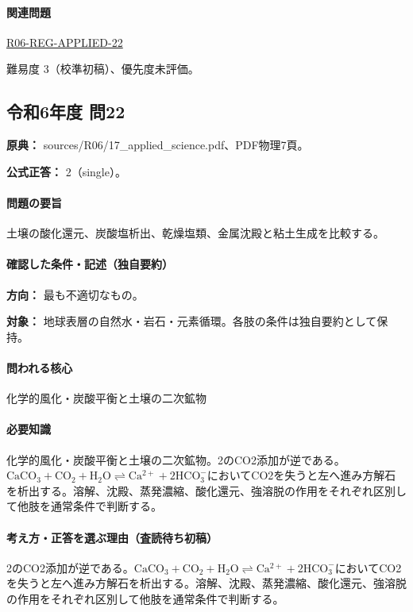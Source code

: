 \paragraph{関連問題} \hyperref[q:r06-reg-applied-22]{R06-REG-APPLIED-22}

\par 難易度 3（校準初稿）、優先度未評価。

\subsection{令和6年度 問22}
\label{q:r06-reg-applied-22}

\noindent\textbf{原典：} sources/R06/17\_applied\_science.pdf、PDF物理7頁。

\textbf{公式正答：} 2（single）。

\paragraph{問題の要旨} 土壌の酸化還元、炭酸塩析出、乾燥塩類、金属沈殿と粘土生成を比較する。

\paragraph{確認した条件・記述（独自要約）}\mbox{}\par

\noindent\textbf{方向：} 最も不適切なもの。\par

\noindent\textbf{対象：} 地球表層の自然水・岩石・元素循環。各肢の条件は独自要約として保持。\par

\paragraph{問われる核心} 化学的風化・炭酸平衡と土壌の二次鉱物

\paragraph{必要知識} 化学的風化・炭酸平衡と土壌の二次鉱物。2のCO2添加が逆である。\(\mathrm{CaCO_3+CO_2+H_2O\rightleftharpoons Ca^{2+}+2HCO_3^-}\)においてCO2を失うと左へ進み方解石を析出する。溶解、沈殿、蒸発濃縮、酸化還元、強溶脱の作用をそれぞれ区別して他肢を通常条件で判断する。

\paragraph{考え方・正答を選ぶ理由（査読待ち初稿）} 2のCO2添加が逆である。\(\mathrm{CaCO_3+CO_2+H_2O\rightleftharpoons Ca^{2+}+2HCO_3^-}\)においてCO2を失うと左へ進み方解石を析出する。溶解、沈殿、蒸発濃縮、酸化還元、強溶脱の作用をそれぞれ区別して他肢を通常条件で判断する。

